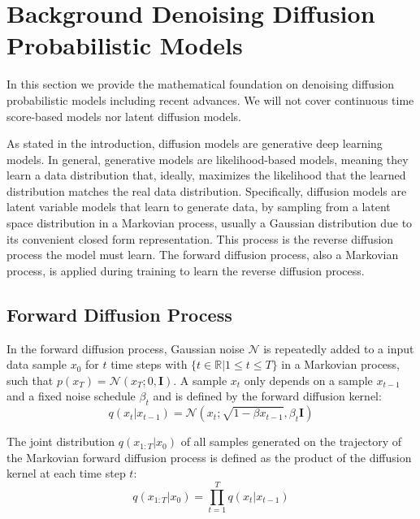 \section{Background Denoising Diffusion Probabilistic Models} \label{sec:background}
In this section we provide the mathematical foundation on denoising diffusion probabilistic models including recent advances. We will not cover continuous time score-based models nor latent diffusion models.

As stated in the introduction, diffusion models are generative deep learning models. In general, generative models are likelihood-based models, meaning they learn a data distribution that, ideally, maximizes the likelihood that the learned distribution matches the real data distribution. Specifically, diffusion models are latent variable models that learn to generate data, by sampling from a latent space distribution in a Markovian process, usually a Gaussian distribution due to its convenient closed form representation. This process is the reverse diffusion process the model must learn. The forward diffusion process, also a Markovian process, is applied during training to learn the reverse diffusion process.

\subsection{Forward Diffusion Process} \label{sec:forward_diffusion_process}
In the forward diffusion process, Gaussian noise $\mathcal{N}$ is repeatedly added to a input data sample $x_0$ for $t$ time steps with $\{t \in \mathbb{R} | 1 \le t \le T\}$ in a Markovian process, such that $p\left(x_T\right)=\mathcal{N}\left(x_T;0,\boldsymbol{I}\right)$.
A sample $x_t$ only depends on a sample $x_{t-1}$ and a fixed noise schedule $\beta_t$ and is defined by the forward diffusion kernel:
\begin{equation}
\label{eq:diffusion_kernel}
q\left(x_t|x_{t-1}\right) = \mathcal{N}\left(x_t;\sqrt{1-\beta x_{t-1}},\beta_t \boldsymbol{I}\right)
\end{equation}

The joint distribution $q\left(x_{1:T}|x_{0}\right)$ of all samples generated on the trajectory of the Markovian forward diffusion process is defined as the product of the diffusion kernel at each time step $t$:
\begin{equation}
q\left(x_{1:T}|x_{0}\right) = \prod_{t=1}^{T} q\left(x_t|x_{t-1}\right)
\end{equation}

